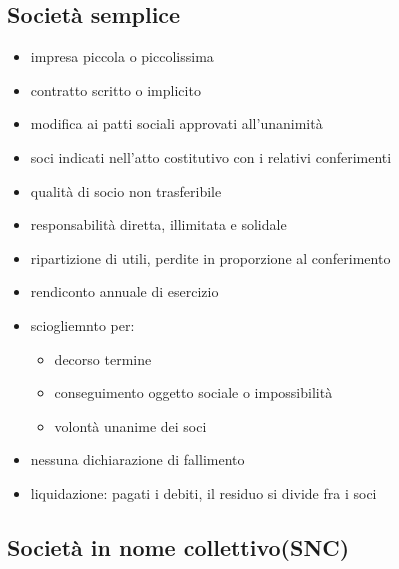 \subsection{Società semplice}
\begin{itemize}
    \item impresa piccola o piccolissima
    \item contratto scritto o implicito
    \item modifica ai patti sociali approvati all'unanimità
    \item soci indicati nell'atto costitutivo con i relativi conferimenti
    \item qualità di socio non trasferibile
    \item responsabilità diretta, illimitata e solidale
    \item ripartizione di utili, perdite in proporzione al conferimento
    \item rendiconto annuale di esercizio
    \item sciogliemnto per:
    \begin{itemize}
        \item decorso termine
        \item conseguimento oggetto sociale o impossibilità
        \item volontà unanime dei soci
    \end{itemize}
    \item nessuna dichiarazione di fallimento
    \item liquidazione: pagati i debiti, il residuo si divide fra i soci
\end{itemize}

\subsection{Società in nome collettivo(SNC)}
